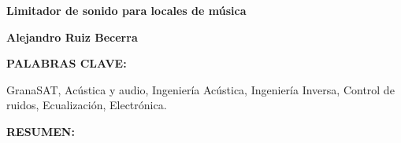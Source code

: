 \clearpage
{}
\noindent
\thispagestyle{empty}


\vspace{-1.48cm}
\begin{center}
    \textbf{\Large Limitador de sonido para locales de música}
\par\end{center}{\Large \par}

\begin{center}
    \textbf{\large Alejandro Ruiz Becerra}
    \par\end{center}{\large \par}

\vspace{0.75cm}


\begin{doublespace}
    \noindent \textbf{PALABRAS CLAVE:}
\end{doublespace}


\begin{singlespace}
    \noindent GranaSAT, Acústica y audio, Ingeniería Acústica, Ingeniería Inversa, Control de ruidos, Ecualización, Electrónica.
\end{singlespace}

\begin{doublespace}
    \noindent \textbf{RESUMEN:}
\end{doublespace}


